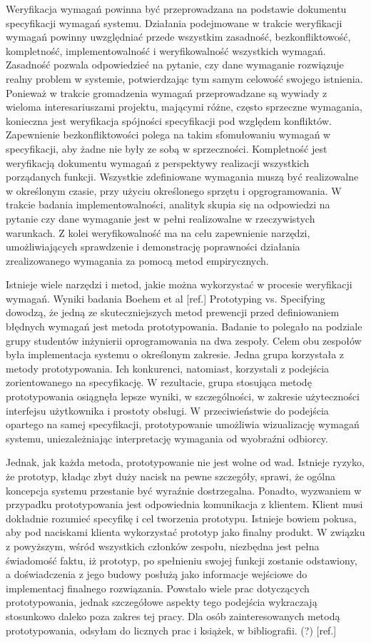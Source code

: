         Weryfikacja wymagań powinna być przeprowadzana na podstawie dokumentu specyfikacji wymagań systemu. Działania podejmowane w trakcie weryfikacji wymagań powinny uwzględniać przede wszystkim zasadność, bezkonfliktowość, kompletność, implementowalność i weryfikowalność wszystkich wymagań. Zasadność pozwala odpowiedzieć na pytanie, czy dane wymaganie rozwiązuje realny problem w systemie, potwierdzając tym samym celowość swojego istnienia. Ponieważ w trakcie gromadzenia wymagań przeprowadzane są wywiady z wieloma interesariuszami projektu, mającymi różne, często sprzeczne wymagania, konieczna jest weryfikacja spójności specyfikacji pod względem konfliktów. Zapewnienie bezkonfliktowości polega na takim sfomułowaniu wymagań w specyfikacji, aby żadne nie były ze sobą w sprzeczności. Kompletność jest weryfikacją dokumentu wymagań z perspektywy realizacji wszystkich porządanych funkcji. Wszystkie zdefiniowane wymagania muszą być realizowalne w określonym czasie, przy użyciu określonego sprzętu i opgrogramowania. W trakcie badania implementowalności, analityk skupia się na odpowiedzi na pytanie czy dane wymaganie jest w pełni realizowalne w rzeczywistych warunkach. Z kolei weryfikowalność ma na celu zapewnienie narzędzi, umożliwiających sprawdzenie i demonstrację poprawności działania zrealizowanego wymagania za pomocą metod empirycznych.

        Istnieje wiele narzędzi i metod, jakie można wykorzystać w procesie weryfikacji wymagań. Wyniki badania Boehem et al [ref.] Prototyping vs. Specifying dowodzą, że jedną ze skuteczniejszych metod prewencji przed definiowaniem błędnych wymagań jest metoda prototypowania. Badanie to polegało na podziale grupy studentów inżynierii oprogramowania na dwa zespoły. Celem obu zespołów była implementacja systemu o określonym zakresie. Jedna grupa korzystała z metody prototypowania. Ich konkurenci, natomiast, korzystali z podejścia zorientowanego na specyfikację. W rezultacie, grupa stosująca metodę prototypowania osiągnęła lepsze wyniki, w szczególności, w zakresie użyteczności interfejsu użytkownika i prostoty obsługi. W przeciwieństwie do podejścia opartego na samej specyfikacji, prototypowanie umożliwia wizualizację wymagań systemu, uniezależniając interpretację wymagania od wyobraźni odbiorcy. 

        Jednak, jak każda metoda, prototypowanie nie jest wolne od wad. Istnieje ryzyko, że prototyp, kładąc zbyt duży nacisk na pewne szczegóły, sprawi, że ogólna koncepcja systemu przestanie być wyraźnie dostrzegalna. Ponadto, wyzwaniem w przypadku prototypowania jest odpowiednia komunikacja z klientem. Klient musi dokładnie rozumieć specyfikę i cel tworzenia prototypu. Istnieje bowiem pokusa, aby pod naciskami klienta wykorzystać prototyp jako finalny produkt. W związku z powyższym, wśród wszystkich członków zespołu, niezbędna jest pełna świadomość faktu, iż prototyp, po spełnieniu swojej funkcji zostanie odstawiony, a doświadczenia z jego budowy posłużą jako informacje wejściowe do implementacj finalnego rozwiązania. Powstało wiele prac dotyczących prototypowania, jednak szczegółowe aspekty tego podejścia wykraczają stosunkowo daleko poza zakres tej pracy. Dla osób zainteresowanych metodą prototypowania, odsyłam do licznych prac i książek, w bibliografii. (?) [ref.] 


